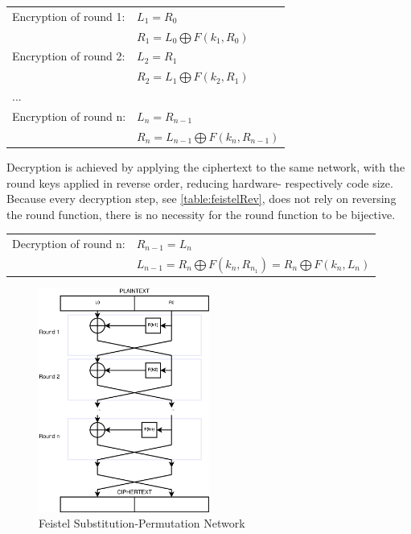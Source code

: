 \begin{center}
\begin{tabular}{ l l}
 \label{table:feistel}
  Encryption of round 1: & $L_1 = R_0$  \\ 
   &  $R_1 = L_0 \bigoplus F(k_1, R_0)$\\ \hline
  Encryption of round 2: & $L_{2} = R_1$  \\
   &  $R_{2} = L_1 \bigoplus F(k_2, R_1)$ \\ \hline
   ... &  \\ \hline
   Encryption of round n: & $L_{n} = R_{n-1}$ \\
   & $R_n = L_{n-1} \bigoplus F(k_n, R_{n-1})$ \\
\end{tabular}
\end{center}
Decryption is achieved by applying the ciphertext to the same network, with the round keys applied in reverse order, reducing hardware- respectively
code size. Because every decryption step, see \ref{table:feistelRev}, does not rely on reversing the round function, there is no necessity for the round function to be bijective.
\begin{center}
\begin{tabular}{ l l}
 \label{table:feistelRev}
Decryption of round n: & $R_{n-1} = L_n$  \\
 & $L_{n-1} = R_n \bigoplus F(k_n, R_{n_1}) = R_n \bigoplus F(k_n, L_{n}) $
\end{tabular}
\end{center}

\begin{figure}
    \centering
    \includegraphics[width=0.5\textwidth]{figures/feistel.eps}
    \caption{Feistel Substitution-Permutation Network}
    \label{fig:feistel}
\end{figure}

